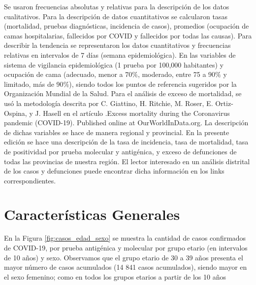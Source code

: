\documentclass[12pt,a4paper,openany]{book}
\begin{document}
	Se usaron frecuencias absolutas y relativas para la descripción de los datos cualitativos. Para la
	descripción de datos cuantitativos se calcularon tasas (mortalidad, pruebas diagnósticas, incidencia de casos), promedios (ocupación de camas hospitalarias, fallecidos por COVID y fallecidos por todas las causas). Para describir la tendencia se representaron los datos cuantitativos y frecuencias relativas en intervalos de 7 días (semana epidemiológica). En las variables de sistema de vigilancia epidemiológica (1 prueba por 100,000 habitantes) y ocupación de cama (adecuado, menor a 70$\%$, moderado, entre 75 a 90$\%$ y limitado, más de 90$\%$), siendo todos los puntos de referencia sugeridos por la Organización Mundial de la Salud. Para el análisis de exceso de mortalidad, se usó la metodología descrita por C. Giattino, H. Ritchie, M. Roser, E. Ortiz-Ospina, y J. Hasell en el artículo .Excess mortality during the Coronavirus pandemic (COVID-19). Published online at OurWorldInData.org.
	La descripción de dichas variables se hace de manera regional y provincial. En la presente edición
	se hace una descripción de la tasa de incidencia, tasa de mortalidad, tasa de positividad por prueba
	molecular y antigénica, y exceso de defunciones de todas las provincias de nuestra región. El lector
	interesado en un análisis distrital de los casos y defunciones puede encontrar dicha información en
	los links correspondientes.
	
	
	\clearpage	
	\section*{Características Generales}
	\noindent En la Figura \ref{fig:casos_edad_sexo} se muestra la cantidad de casos confirmados de COVID-19, por prueba antigénica y molecular por grupo etario (en intervalos de 10 años) y sexo. Observamos que el grupo etario de 30 a 39 años presenta el mayor número de casos acumulados (14 841 casos acumulados), siendo mayor en el sexo femenino; como en todos los grupos etarios a partir de los 10 años 
	
\end{document}
